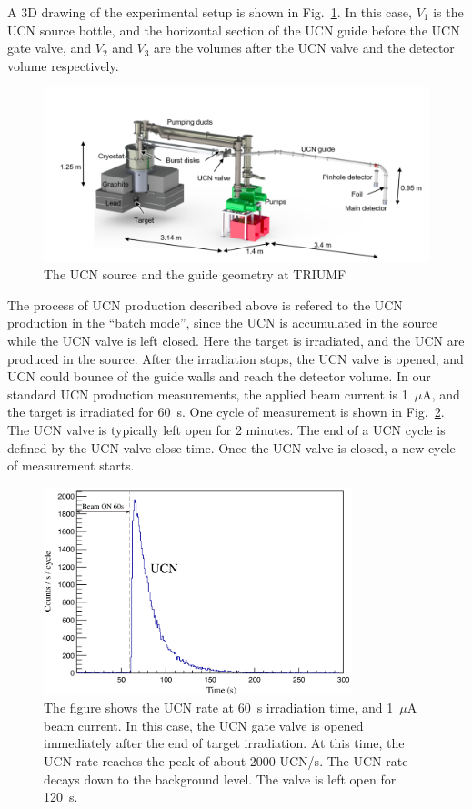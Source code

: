 A 3D drawing of the experimental setup is shown in
Fig.~\ref{fig:Source_all}. In this case, $V_1$ is the UCN source
bottle, and the horizontal section of the UCN guide before the UCN gate
valve, and $V_2$ and $V_3$ are the volumes after the UCN valve and the
detector volume respectively.

\begin{figure}[h!]
  \centering
  \includegraphics[width=1.1\textwidth]{Source_all.png}
  \caption{The UCN source and the guide geometry at TRIUMF }
  \label{fig:Source_all}
\end{figure}
The process of UCN production described above is refered to the UCN
production in the ``batch mode'', since the UCN is accumulated in the
source while the UCN valve is left closed. Here the target is
irradiated, and the UCN are produced in the source. After the
irradiation stops, the UCN valve is opened, and UCN could bounce of
the guide walls and reach the detector volume. In our standard UCN
production measurements, the applied beam current is 1~$\mu$A, and the
target is irradiated for 60~s. One cycle of measurement is shown in
Fig.~\ref{fig:UCNRate}. The UCN valve is typically left open for 2
minutes. The end of a UCN cycle is defined by the UCN valve close
time. Once the UCN valve is closed, a new cycle of measurement starts.


\begin{figure}[h!]
  \centering
  \includegraphics[width=0.8\textwidth]{UCNRate.png}
  \caption{The figure shows the UCN rate at 60~s irradiation time, and
    1~$\mu$A beam current. In this case, the UCN gate valve is opened
    immediately after the end of target irradiation. At this time, the
    UCN rate reaches the peak of about 2000 UCN/s. The UCN rate decays
    down to the background level. The valve is left open for 120~s. }
  \label{fig:UCNRate}
\end{figure}


